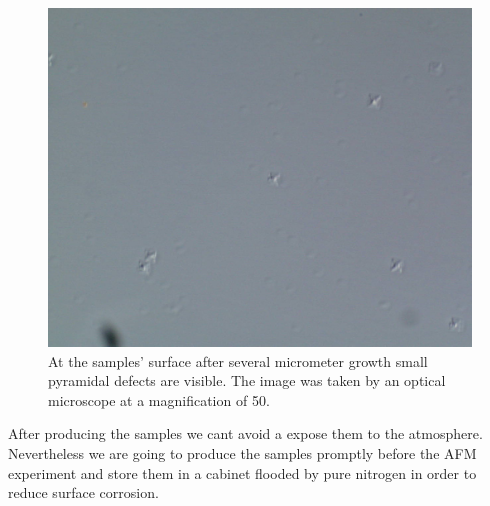 \begin{figure}[htb]
  \includegraphics[width=\linewidth]{Bilder/A2749_50_1}
  \caption{At the samples' surface after several micrometer growth small pyramidal defects are visible. The image was taken by an optical microscope at a magnification of 50.}
  \label{bandluecke}
\end{figure}

After producing the samples we cant avoid a expose them to the atmosphere. Nevertheless we are going to produce the samples promptly before the AFM experiment and store them in a cabinet flooded by pure nitrogen in order to reduce surface corrosion.



%
%	
%

